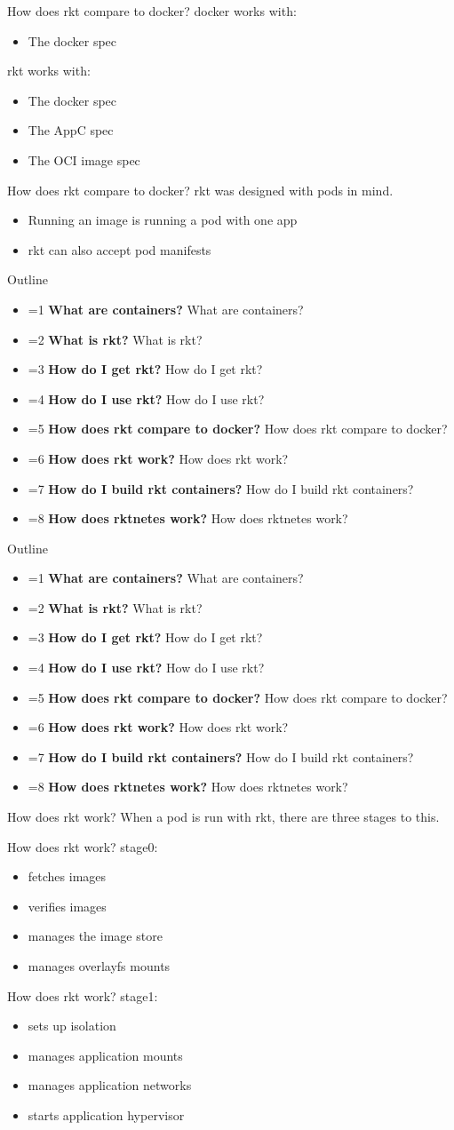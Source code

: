 \documentclass[pdf,aspectratio=169,14pt]{beamer}
\newcommand{\mbold}[3]{
    \ifnum #1=#2
        \textbf{#3}
    \else
        #3
    \fi
}
\newcommand{\outline}[1]{
    \begin{frame}
        Outline
        \begin{itemize}
            \item \mbold{#1}{1}{What are containers?}
            \item \mbold{#1}{2}{What is rkt?}
            \item \mbold{#1}{3}{How do I get rkt?}
            \item \mbold{#1}{4}{How do I use rkt?}
            \item \mbold{#1}{5}{How does rkt compare to docker?}
            \item \mbold{#1}{6}{How does rkt work?}
            \item \mbold{#1}{7}{How do I build rkt containers?}
            \item \mbold{#1}{8}{How does rktnetes work?}
        \end{itemize}
    \end{frame}
}
\begin{document}
\begin{frame}{How does rkt compare to docker?}
    docker works with:
    \begin{itemize}
        \item The docker spec
    \end{itemize}
    \pause
    \vspace{1em}
    rkt works with:
    \begin{itemize}
        \item The docker spec
        \item The AppC spec
        \item The OCI image spec
    \end{itemize}
\end{frame}

\begin{frame}{How does rkt compare to docker?}
    rkt was designed with pods in mind.
    \begin{itemize}
        \item Running an image is running a pod with one app
        \item rkt can also accept pod manifests
    \end{itemize}
\end{frame}


\outline{5}
\outline{6}

\begin{frame}{How does rkt work?}
    When a pod is run with rkt, there are three stages to this.
\end{frame}

\begin{frame}{How does rkt work?}
    stage0:
    \begin{itemize}
        \item fetches images
        \item verifies images
        \item manages the image store
        \item manages overlayfs mounts
    \end{itemize}
\end{frame}

\begin{frame}{How does rkt work?}
    stage1:
    \begin{itemize}
        \item sets up isolation
        \item manages application mounts
        \item manages application networks
        \item starts application hypervisor
    \end{itemize}
\end{frame}
\end{document}
